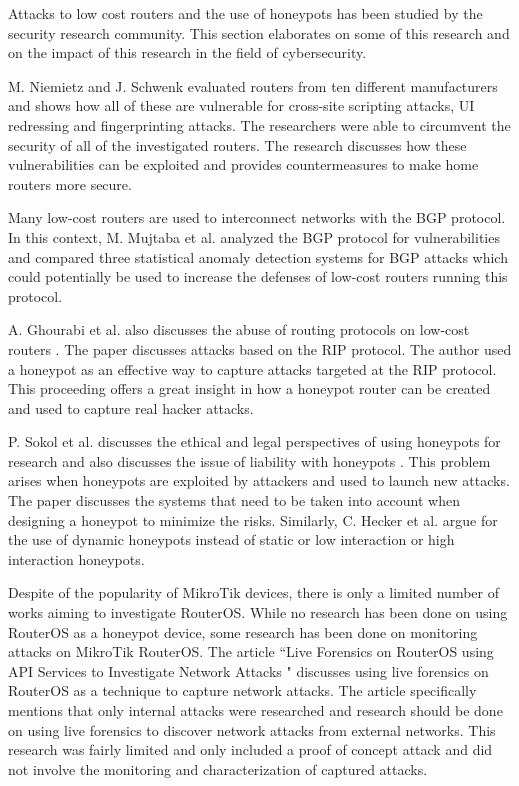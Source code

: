 Attacks to low cost routers  and the use of honeypots has been studied by the security research community. This section elaborates on some of this research and on the impact of this research in the field of cybersecurity.

M. Niemietz and J. Schwenk \cite{ROUTERSEC:RUB:2015} evaluated routers from ten different manufacturers and shows how all of these are vulnerable for cross-site scripting attacks, UI redressing and fingerprinting attacks. The researchers were able to circumvent the security of all of the investigated routers. The research discusses how these vulnerabilities can be exploited and provides countermeasures to make home routers more secure.

Many low-cost routers are used to interconnect networks with the BGP protocol. In this context, M. Mujtaba et al. \cite{BGPANALYSIS:EDCOUN:2011} analyzed the BGP protocol for vulnerabilities and compared three statistical anomaly detection systems for BGP attacks which could potentially be used to increase the defenses of low-cost routers running this protocol.

A. Ghourabi et al. also discusses the abuse of routing protocols on low-cost routers \cite{HONEYPOT:IEETR:2009}. The paper discusses attacks based on the RIP protocol. The author used a honeypot as an effective way to capture attacks targeted at the RIP protocol. This proceeding offers a great insight in how a honeypot router can be created and used to capture real hacker attacks. 

P. Sokol et al. discusses the ethical and legal perspectives of using honeypots for research and also discusses the issue of liability with honeypots \cite{HONEYPOTSLIABILITY:SPRINGER:2015}. This problem arises when honeypots are exploited by attackers and used to launch new attacks. The paper discusses the systems that need to be taken into account when designing a honeypot to minimize the risks. Similarly, C. Hecker et al. \cite{HONEYPOT:MARY:2006} argue for the use of dynamic honeypots instead of static or low interaction or high interaction honeypots.

Despite of the popularity of MikroTik devices, there is only a limited number of works aiming to investigate RouterOS. While no research has been done on using RouterOS as a honeypot device, some research has been done on monitoring attacks on MikroTik RouterOS. The article ``Live Forensics on RouterOS using API Services to Investigate Network Attacks \cite{ROUTEROSFORENSICS:IJCSIS:2017}" discusses using live forensics on RouterOS as a technique to capture network attacks. The article specifically mentions that only internal attacks were researched and research should be done on using live forensics to discover network attacks from external networks. This research was fairly limited and only included a proof of concept attack and did not involve the monitoring and characterization of captured attacks.


